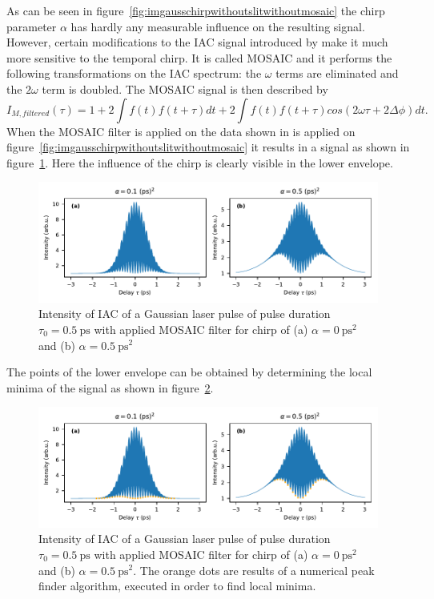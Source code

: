 As can be seen in figure~\ref{fig:imgausschirpwithoutslitwithoutmosaic} the chirp parameter $\alpha$ has hardly any measurable influence on the resulting signal.
However, certain modifications to the \ac{IAC} signal introduced by \textcite{hirayama_real-time_2002} make it much more sensitive to the temporal chirp.
It is called \ac{MOSAIC} and it performs the following transformations on the \ac{IAC} spectrum: the $\omega$ terms are eliminated and the $2\omega$ term is doubled.
The \ac{MOSAIC} signal is then described by
\begin{equation}
\label{eq:i-m-filtered}
I_{M, filtered}(\tau) = 1 + 2 \int f(t) f(t + \tau) dt + 2 \int f(t) f(t + \tau) cos(2\omega \tau + 2\Delta \phi) dt.
\end{equation}
When the MOSAIC filter is applied on the data shown in is applied on figure~\ref{fig:imgausschirpwithoutslitwithoutmosaic} it results in a signal as shown in figure~\ref{fig:mosaicchirpedlaserpulse}.
Here the influence of the chirp is clearly visible in the lower envelope.
\begin{figure}[H]
	\centering
	\includegraphics[width=\linewidth]{figures/chirp/plots/mosaic_chirped_laser_pulse}
	\caption{Intensity of IAC of a Gaussian laser pulse of pulse duration $\tau_0=\SI{0.5}{\pico \second}$ with applied MOSAIC filter for chirp of (a) $\alpha = \SI{0}{\pico \second \squared}$ and (b) $\alpha = \SI{0.5}{\pico \second \squared}$}
	\label{fig:mosaicchirpedlaserpulse}
\end{figure}
The points of the lower envelope can be obtained by determining the local minima of the signal as shown in figure~\ref{fig:mosaicchirpedlaserpulsefindenvelope}.

\begin{figure}[H]
	\centering
	\includegraphics[width=\linewidth]{figures/chirp/plots/mosaic_chirped_laser_pulse_find_envelope}
	\caption{Intensity of IAC of a Gaussian laser pulse of pulse duration $\tau_0=\SI{0.5}{\pico \second}$ with applied MOSAIC filter for chirp of (a) $\alpha = \SI{0}{\pico \second \squared}$ and (b) $\alpha = \SI{0.5}{\pico \second \squared}$.
		The orange dots are results of a numerical peak finder algorithm, executed in order to find local minima.}
	\label{fig:mosaicchirpedlaserpulsefindenvelope}
\end{figure}

